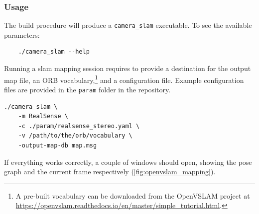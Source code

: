 \documentclass[11pt, letterpaper, twoside]{article}
\begin{document}
\subsubsection{Usage}

The build procedure will produce a \texttt{camera\_slam} executable. To see the
available parameters:
\begin{verbatim}
    ./camera_slam --help
\end{verbatim}

Running a \gls{slam} mapping session requires to provide a destination for the
output map file, an ORB vocabulary,\footnote{A pre-built vocabulary can be
downloaded from the OpenVSLAM project at
\url{https://openvslam.readthedocs.io/en/master/simple_tutorial.html}.} and a
configuration file. Example configuration files are provided in the
\texttt{param} folder in the repository.

\begin{verbatim}
./camera_slam \
    -m RealSense \
    -c ./param/realsense_stereo.yaml \
    -v /path/to/the/orb/vocabulary \
    -output-map-db map.msg
\end{verbatim}

If everything works correctly, a couple of windows should open, showing the
pose graph and the current frame respectively (\cref{fig:openvslam_mapping}).
\end{document}

